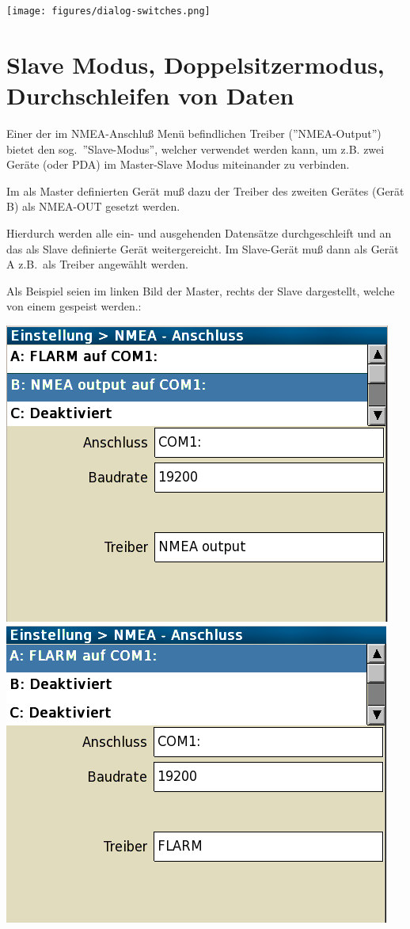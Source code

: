 \begin{center}
\texttt{[image: figures/dialog-switches.png]}
\end{center}
\section{Slave Modus, Doppelsitzermodus,  Durchschleifen von Daten}

Einer der im NMEA-Anschluß Menü befindlichen Treiber (''NMEA-Output'') bietet den sog.\  ''Slave-Modus'', welcher verwendet werden kann,  um z.B. zwei Geräte  (\al oder \textsf{PDA})  im Master-Slave Modus miteinander zu verbinden. 


Im als Master definierten Gerät muß dazu der Treiber des zweiten Gerätes  (Gerät B) als NMEA-OUT gesetzt werden.

Hierdurch werden alle ein- und ausgehenden Datensätze  durchgeschleift und an das als Slave definierte Gerät weitergereicht.
Im Slave-Gerät muß dann als Gerät A z.B.\ \fl als Treiber angewählt werden.

Als Beispiel seien im linken Bild der Master, rechts der Slave dargestellt, welche von einem \fl gespeist werden.:


\begin{center}%
\includegraphics[angle=0,width=0.45\linewidth,keepaspectratio='true']{figures/config-nmea-ms-master.png}~~~\includegraphics[angle=0,width=0.45\linewidth,keepaspectratio='true']{figures/config-nmea-ms-slave.png}
\end{center}

